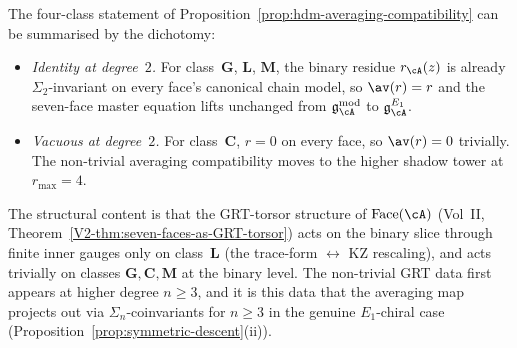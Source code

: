 \begin{remark}
\label{rem:hdm-averaging-compatibility-table}
The four-class statement of
Proposition~\ref{prop:hdm-averaging-compatibility} can be
summarised by the dichotomy:
\begin{itemize}
\item \emph{Identity at degree~$2$.} For class~$\mathbf{G}$,
 $\mathbf{L}$, $\mathbf{M}$, the binary residue $r_\cA(z)$ is
 already $\Sigma_2$-invariant on every face's canonical chain
 model, so $\av(r) = r$ and the seven-face master equation
 lifts unchanged from $\mathfrak{g}_\cA^{\mathrm{mod}}$ to
 $\mathfrak{g}_\cA^{E_1}$.
\item \emph{Vacuous at degree~$2$.} For class~$\mathbf{C}$,
 $r = 0$ on every face, so $\av(r) = 0$ trivially. The
 non-trivial averaging compatibility moves to the higher shadow
 tower at $r_{\max} = 4$.
\end{itemize}
The structural content is that the GRT-torsor structure of
$\Face(\cA)$ (Vol~II, Theorem~\ref{V2-thm:seven-faces-as-GRT-torsor})
acts on the binary slice through finite inner gauges only on
class~$\mathbf{L}$ (the trace-form $\leftrightarrow$ KZ
rescaling), and acts trivially on classes $\mathbf{G},
\mathbf{C}, \mathbf{M}$ at the binary level. The non-trivial
GRT data first appears at higher degree $n \geq 3$, and it is
this data that the averaging map projects out via
$\Sigma_n$-coinvariants for $n \geq 3$ in the genuine $E_1$-chiral
case (Proposition~\ref{prop:symmetric-descent}(ii)).
\end{remark}

